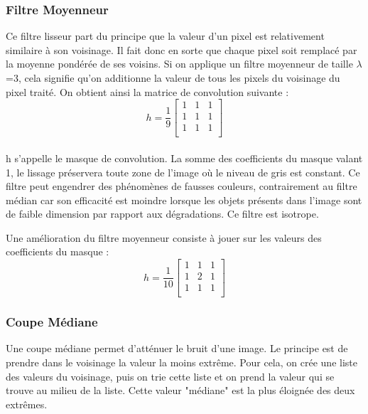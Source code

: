 \subsubsection*{Filtre Moyenneur}

Ce filtre lisseur part du principe que la valeur d'un pixel est relativement similaire à son voisinage. Il fait donc en sorte que chaque pixel soit remplacé par la moyenne pondérée de ses voisins. Si on applique un filtre moyenneur de taille $\lambda$=3, cela signifie qu'on additionne la valeur de tous les pixels du voisinage du pixel traité. On obtient ainsi la matrice de convolution suivante :
$$h = \frac{1}{9}
\begin{bmatrix}
	1 & 1 & 1 \\
	1 & 1 & 1 \\
	1 & 1 & 1 \\
\end{bmatrix}  $$

\paragraph{}
h s’appelle le masque de convolution. La somme des coefficients du masque valant 1, le lissage préservera toute zone de l’image où le niveau de gris est constant. Ce filtre peut engendrer des phénomènes de fausses couleurs, contrairement au filtre médian car son efficacité est moindre lorsque les objets présents dans l'image sont de faible dimension par rapport aux dégradations. Ce filtre est isotrope. 

Une amélioration du filtre moyenneur consiste à jouer sur les valeurs des coefficients du masque :
$$h = \frac{1}{10}
\begin{bmatrix}
	1 & 1 & 1 \\
	1 & 2 & 1 \\
	1 & 1 & 1 \\
\end{bmatrix}  $$

\subsubsection*{Coupe Médiane}

Une coupe médiane permet d’atténuer le bruit d’une image. Le principe est de prendre dans le voisinage la valeur la moins extrême. Pour cela, on crée une liste des valeurs du voisinage, puis on trie cette liste et on prend la valeur qui se trouve au milieu de la liste. Cette valeur "médiane" est la plus éloignée des deux extrêmes.


